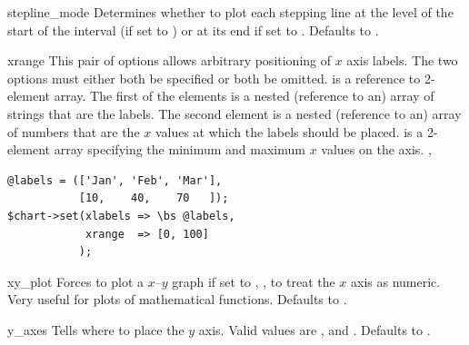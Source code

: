 \begin{AttrDecl}{stepline\_mode}
Determines whether to plot each stepping line at the level of the
start of the interval (if set to ) or at its end if set
to . Defaults to .
\end{AttrDecl}

\begin{AttrDecl}{xrange}
This pair of options allows arbitrary positioning of $x$ axis labels.
The two options must either both be specified or both be omitted.
 is a reference to 2-element array. The first of the
elements is a nested (reference to an) array of strings that are the
labels. The second element is a nested (reference to an) array of
numbers that are the $x$ values at which the labels should be placed.
 is a 2-element array specifying the minimum and maximum
$x$ values on the axis. \Eg,
\begin{verbatim}
@labels = (['Jan', 'Feb', 'Mar'],
           [10,    40,    70   ]);
$chart->set(xlabels => \bs @labels,
            xrange  => [0, 100]
           );
\end{verbatim}
\end{AttrDecl}

\begin{AttrDecl}{xy\_plot}
Forces \thisclass to plot a $x$--$y$ graph if set to , \ie, to
treat the $x$ axis as numeric. Very useful for plots of mathematical
functions. Defaults to .
\end{AttrDecl}

\begin{AttrDecl}{y\_axes}
Tells \thisclass where to place the $y$ axis. Valid
values are ,  and . Defaults
to .
\end{AttrDecl}

